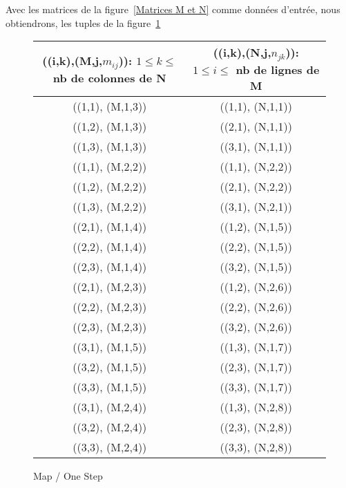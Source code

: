 Avec les matrices de la figure~\ref{Matrices M et N} comme données d'entrée, nous obtiendrons, les tuples  de la figure~\ref{map_one_step}
\littlesectionspace
\begin{figure}[H]
  \begin{center}
    \begin{tabular}{|c|c|}
      \hline
	  ((i,k),(M,j,$m_{ij}$)): $1 \leq k \leq$ nb de colonnes de N  & ((i,k),(N,j,$n_{jk}$)): $1 \leq i \leq$ nb de lignes de M \\
      \hline
      ((1,1), (M,1,3)) & ((1,1), (N,1,1)) \\
      ((1,2), (M,1,3)) & ((2,1), (N,1,1))\\
      ((1,3), (M,1,3)) & ((3,1), (N,1,1))\\
      ((1,1), (M,2,2)) & ((1,1), (N,2,2)) \\ 
      ((1,2), (M,2,2)) & ((2,1), (N,2,2)) \\
      ((1,3), (M,2,2)) & ((3,1), (N,2,1))   \\        
      ((2,1), (M,1,4)) & ((1,2), (N,1,5)) \\
      ((2,2), (M,1,4)) & ((2,2), (N,1,5))\\
      ((2,3), (M,1,4)) & ((3,2), (N,1,5))\\
      ((2,1), (M,2,3)) & ((1,2), (N,2,6)) \\ 
      ((2,2), (M,2,3)) & ((2,2), (N,2,6)) \\
      ((2,3), (M,2,3)) & ((3,2), (N,2,6))   \\ 
      ((3,1), (M,1,5)) & ((1,3), (N,1,7)) \\
      ((3,2), (M,1,5)) & ((2,3), (N,1,7))\\
      ((3,3), (M,1,5)) & ((3,3), (N,1,7))\\
      ((3,1), (M,2,4)) & ((1,3), (N,2,8)) \\ 
      ((3,2), (M,2,4)) & ((2,3), (N,2,8)) \\
      ((3,3), (M,2,4)) & ((3,3), (N,2,8))   \\               
      \hline
    \end{tabular}
    \caption{Map / One Step}
    \label{map_one_step}
  \end{center}
\end{figure}
     
